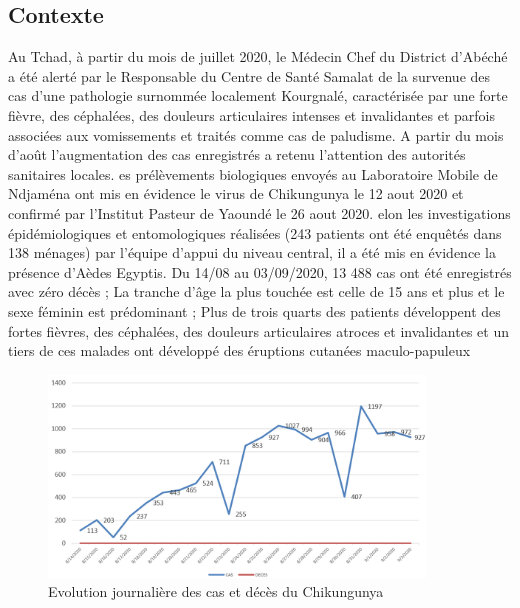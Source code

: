 \subsection{Contexte}
Au Tchad, à partir du mois de juillet 2020, le Médecin Chef du District d’Abéché a été alerté par le Responsable du Centre de
Santé Samalat de la survenue des cas d'une pathologie surnommée localement Kourgnalé, caractérisée par une forte fièvre,
des céphalées, des douleurs articulaires intenses et invalidantes et parfois associées aux vomissements et traités comme cas de
paludisme. A partir du mois d’août l’augmentation des cas enregistrés a retenu l’attention des autorités sanitaires locales.
es prélèvements biologiques envoyés au Laboratoire Mobile de Ndjaména ont mis en évidence le virus de Chikungunya le
12 aout 2020 et confirmé par l’Institut Pasteur de Yaoundé le 26 aout 2020.
elon les investigations épidémiologiques et entomologiques réalisées (243 patients ont été enquêtés dans 138 ménages) par
l’équipe d’appui du niveau central, il a été mis en évidence la présence d’Aèdes Egyptis.
Du 14/08 au 03/09/2020, 13 488 cas ont été enregistrés avec zéro décès ;
La tranche d’âge la plus touchée est celle de 15 ans et plus et le sexe féminin est prédominant ;
Plus de trois quarts des patients développent des fortes fièvres, des céphalées, des douleurs articulaires atroces et invalidantes
et un tiers de ces malades ont développé des éruptions cutanées maculo-papuleux
\begin{figure}[!h]
	\begin{center}
		\includegraphics[width=10cm]{images/statsCaseChad}
	\end{center}
	\caption{ Evolution journalière des cas et décès du Chikungunya}
	\label{fig:chikvevolution}
\end{figure}